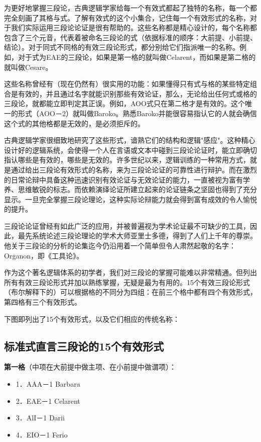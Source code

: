 为更好地掌握三段论，古典逻辑学家给每一个有效式都起了独特的名称，每一个都完全刻画了其格与式。了解有效式的这个小集合，记住每一个有效形式的名称，对于我们实际运用三段论论证是很有帮助的。这些名称都是精心设计的，每个名称都包含了三个元音，代表着被命名三段论的式（依据标准的顺序：大前提、小前提、结论）。对于同式不同格的有效三段论形式，都分别给它们指派唯一的名称。例如，对于式为EAE的三段论，如果是第一格的就叫做Celarent，而如果是第二格的就叫做Cesare。\cite{lukasiewicz1957}

这些名称曾经有（现在仍然有）很实用的功能：如果懂得只有式与格的某些特定组合是有效的，并且通过名字就能识别那些有效论证，那么，无论给出任何式或格的三段论，就都能立即判定其正误。例如，AOO式只在第二格才是有效的。这个唯一的形式（AOO－2）就叫做Baroko。\cite{copi1980}熟悉Baroko并能很容易指认它的人就会确信这个式的其他格都是无效的，是必须拒斥的。

古典逻辑学家很细致地研究了这些形式，谙熟它们的结构和逻辑"感应"。这种精心设计好的逻辑系统，会使得一个人在言语或文本中碰到三段论论证时，能立即确切指认哪些是有效的，哪些是无效的。许多世纪以来，逻辑训练的一种常用方式，就是通过给出三段论有效形式的名称，来为三段论论证的可靠性进行辩护。而在激烈的日常论辩中具备这种迅速识别有效论证与无效论证的能力，一直被视为富有学养、思维敏锐的标志。而依赖演绎论证所建立起来的论证链条之坚固也得到了充分显示。一旦完全掌握三段论理论，这种实际论辩能力就会得到富有成效的令人愉悦的提升。

三段论论证曾经有如此广泛的应用，并被普遍视为学术论证最不可缺少的工具，因此，最先系统论述三段论理论的学术大师亚里士多德，得到了人们上千年的尊崇。他关于三段论的分析的论集迄今仍沿用着一个简单但令人肃然起敬的名字：Organon，即《工具论》。

作为这个著名逻辑体系的初学者，我们对三段论的掌握可能难以非常精通。但列出所有有效三段论形式并加以熟练掌握，无疑是最为有用的。15个有效三段论形式（布尔解释下的）可以根据格的不同分为四组：在前三个格中都有四个有效形式，第四格有三个有效形式。\cite{patzig1968}

下图即列出了15个有效形式，以及它们相应的传统名称：

\subsection{标准式直言三段论的15个有效形式}
\textbf{第一格}（中项在大前提中做主项、在小前提中做谓项）：
\begin{itemize}
\item 1．AAA－1 Barbara
\item 2．EAE－1 Celarent
\item 3．AlI－1 Darii
\item 4．EIO－1 Ferio
\end{itemize}


